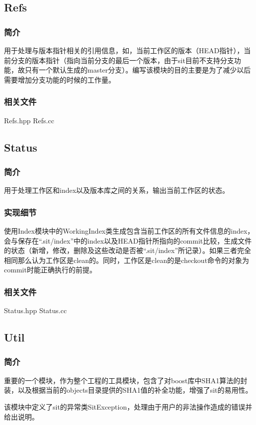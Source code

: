 \documentclass[11pt, a4paper, UTF8]{ctexart}
\begin{document}
\subsection{Refs}
\subsubsection{简介}
用于处理与版本指针相关的引用信息，如，当前工作区的版本（HEAD指针），当前分支的版本指针（指向当前分支的最后一个版本，由于sit目前不支持分支功能，故只有一个默认生成的master分支）。编写该模块的目的主要是为了减少以后需要增加分支功能的时候的工作量。
\subsubsection{相关文件}
Refs.hpp Refs.cc

\subsection{Status}
\subsubsection{简介}
用于处理工作区和index以及版本库之间的关系，输出当前工作区的状态。
\subsubsection{实现细节}
使用Index模块中的WorkingIndex类生成包含当前工作区的所有文件信息的index，会与保存在``.sit/index''中的index以及HEAD指针所指向的commit比较，生成文件的状态（新增，修改，删除及这些改动是否被``.sit/index''所记录）。如果三者完全相同那么认为工作区是clean的。同时，工作区是clean的是checkout命令的对象为commit时能正确执行的前提。
\subsubsection{相关文件}
Status.hpp Status.cc

\subsection{Util}
\subsubsection{简介}
重要的一个模块，作为整个工程的工具模块，包含了对boost库中SHA1算法的封装，以及根据当前的objects目录提供的SHA1值的补全功能，增强了sit的易用性。

该模块中定义了sit的异常类SitException，处理由于用户的非法操作造成的错误并给出说明。
\end{document}

